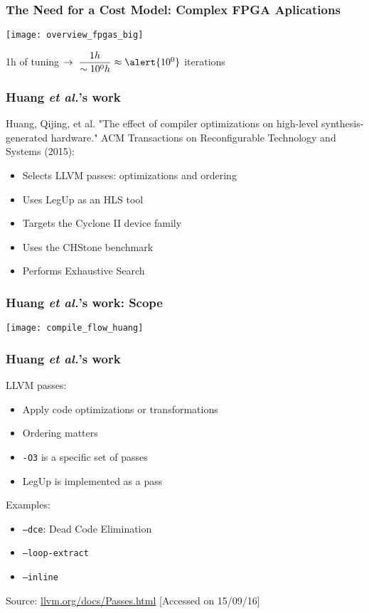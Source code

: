 \documentclass[10pt, compress, aspectratio=169]{beamer}
\begin{document}
\begin{frame}
    \frametitle{The Need for a Cost Model: Complex FPGA Aplications}
    \begin{center}
        \texttt{[image: overview\_fpgas\_big]}

        \vfill

        \alert{1h} of tuning $\rightarrow \; \dfrac{1h}{\sim{}10^0h} \approx \alert{10^0}$ \alert{iterations}
    \end{center}
\end{frame}

\begin{frame}
    \frametitle{Huang \textit{et al.}'s work}
        Huang, Qijing, et al. "The effect of compiler optimizations
        on high-level synthesis-generated hardware." ACM Transactions on
        Reconfigurable Technology and Systems (2015):
    \begin{itemize}
        \item Selects \alert{LLVM passes}: optimizations and ordering
        \item Uses \alert{LegUp} as an HLS tool
        \item Targets the Cyclone II device family
        \item Uses the \alert{CHStone benchmark}
        \item Performs \alert{Exhaustive Search}
    \end{itemize}
\end{frame}

\begin{frame}
    \frametitle{Huang \textit{et al.}'s work: Scope}
    \begin{center}
        \texttt{[image: compile\_flow\_huang]}
    \end{center}
\end{frame}

\begin{frame}
    \frametitle{Huang \textit{et al.}'s work}
    LLVM passes:
    \begin{itemize}
        \item Apply code \alert{optimizations} or \alert{transformations}
        \item \alert{Ordering} matters
        \item \texttt{-O3} is a specific \alert{set of passes}
        \item LegUp is implemented as a pass
    \end{itemize}

    Examples:
    \begin{itemize}
        \item \texttt{--dce}: Dead Code Elimination
        \item \texttt{--loop-extract}
        \item \texttt{--inline}
    \end{itemize}

    \begin{center}
        \tiny{Source: \url{llvm.org/docs/Passes.html} [Accessed on 15/09/16]}
    \end{center}
\end{frame}
\end{document}
